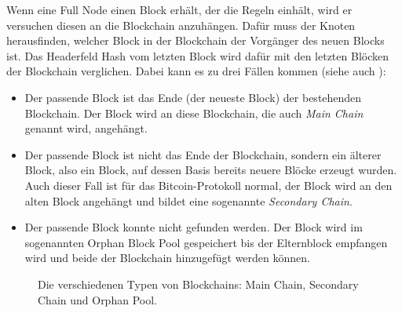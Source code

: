 \documentclass[ngerman,runningheads,a4paper]{llncs}[2018/03/10]
\begin{document}
Wenn eine Full Node einen Block erhält, der die Regeln einhält, wird er versuchen diesen an die Blockchain anzuhängen. Dafür muss der Knoten herausfinden, welcher Block in der Blockchain der Vorgänger des neuen Blocks ist. Das Headerfeld Hash vom letzten Block wird dafür mit den letzten Blöcken der Blockchain verglichen. Dabei kann es zu drei Fällen kommen (siehe auch ):

\begin{itemize}

\item Der passende Block ist das Ende (der neueste Block) der bestehenden Blockchain. Der Block wird an diese Blockchain, die auch \textit{Main Chain} genannt wird, angehängt.

\item Der passende Block ist nicht das Ende der Blockchain, sondern ein älterer Block, also ein Block, auf dessen Basis bereits neuere Blöcke erzeugt wurden. Auch dieser Fall ist für das Bitcoin-Protokoll normal, der Block wird an den alten Block angehängt und bildet eine sogenannte \textit{Secondary Chain}.

\item Der passende Block konnte nicht gefunden werden. Der Block wird im sogenannten Orphan Block Pool gespeichert bis der Elternblock empfangen wird und beide der Blockchain hinzugefügt werden können.

\end{itemize}

\begin{figure}
  \centering
  \caption{Die verschiedenen Typen von Blockchains: Main Chain, Secondary Chain und Orphan Pool.}
  \label{fig:blockchainTypes}
\end{figure}
\end{document}
